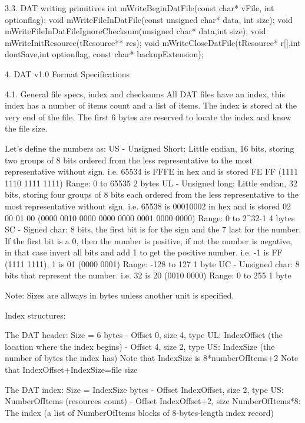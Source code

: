 3.3. DAT writing primitives
 int  mWriteBeginDatFile(const char* vFile, int optionflag);
 void mWriteFileInDatFile(const unsigned char* data, int size);
 void mWriteFileInDatFileIgnoreChecksum(unsigned char* data,int size);
 void mWriteInitResource(tResource** res);
 void mWriteCloseDatFile(tResource* r[],int dontSave,int optionflag, const
      char* backupExtension);


4. DAT v1.0 Format Specifications
   ~~~ ~~~~ ~~~~~~ ~~~~~~~~~~~~~~

4.1. General file specs, index and checksums
 All DAT files have an index, this index has a number of items count and
 a list of items.
 The index is stored at the very end of the file.
 The first 6 bytes are reserved to locate the index and know the file size.

 Let's define the numbers as:
  US - Unsigned Short: Little endian, 16 bits, storing two groups of 8 bits
       ordered from the less representative to the most representative
       without sign.
       i.e. 65534 is FFFE in hex and is stored FE FF (1111 1110  1111 1111)
       Range: 0 to 65535
       2 bytes
  UL - Unsigned long: Little endian, 32 bits, storing four groups of 8 bits
       each ordered from the less representative to the most representative
       without sign.
       i.e. 65538 is 00010002 in hex and is stored 02 00 01 00
       (0000 0010  0000 0000  0000 0001  0000 0000)
       Range: 0 to 2^32-1
       4 bytes
  SC - Signed char: 8 bits, the first bit is for the sign and the 7 last
       for the number. If the first bit is a 0, then the number is
       positive, if not the number is negative, in that case invert all
       bits and add 1 to get the positive number.
       i.e. -1 is FF (1111 1111), 1 is 01 (0000 0001)
       Range: -128 to 127
       1 byte
  UC - Unsigned char: 8 bits that represent the number.
       i.e. 32 is 20 (0010 0000)
       Range: 0 to 255
       1 byte

 Note: Sizes are allways in bytes unless another unit is specified.

 Index structures:

 The DAT header: Size = 6 bytes
  - Offset 0, size 4, type UL: IndexOffset
           (the location where the index begins)
  - Offset 4, size 2, type US: IndexSize
           (the number of bytes the index has)
           Note that IndexSize is 8*numberOfItems+2
					 Note that IndexOffset+IndexSize=file size

 The DAT index: Size = IndexSize bytes
  - Offset IndexOffset,   size 2, type US: NumberOfItems
           (resources count)
  - Offset IndexOffset+2, size NumberOfItems*8: The index
           (a list of NumberOfItems blocks of 8-bytes-length index record)


